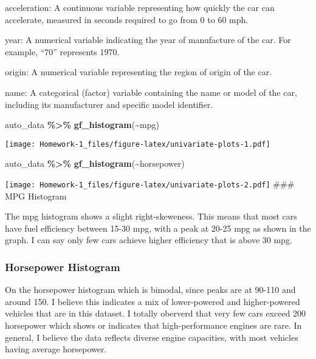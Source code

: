 \documentclass[
]{article}
\newenvironment{Shaded}{\begin{snugshade}}{\end{snugshade}}
\newcommand{\FunctionTok}[1]{\textcolor[rgb]{0.13,0.29,0.53}{\textbf{#1}}}
\newcommand{\NormalTok}[1]{#1}
\newcommand{\SpecialCharTok}[1]{\textcolor[rgb]{0.81,0.36,0.00}{\textbf{#1}}}
\begin{document}
acceleration: A continuous variable representing how quickly the car can
accelerate, measured in seconds required to go from 0 to 60 mph.

year: A numerical variable indicating the year of manufacture of the
car. For example, ``70'' represents 1970.

origin: A numerical variable representing the region of origin of the
car.

name: A categorical (factor) variable containing the name or model of
the car, including its manufacturer and specific model identifier.

\begin{Shaded}
\begin{Highlighting}[]
\NormalTok{auto\_data }\SpecialCharTok{\%\textgreater{}\%} 
  \FunctionTok{gf\_histogram}\NormalTok{(}\SpecialCharTok{\textasciitilde{}}\NormalTok{mpg)}
\end{Highlighting}
\end{Shaded}

\texttt{[image: Homework-1\_files/figure-latex/univariate-plots-1.pdf]}

\begin{Shaded}
\begin{Highlighting}[]
\NormalTok{auto\_data }\SpecialCharTok{\%\textgreater{}\%} 
  \FunctionTok{gf\_histogram}\NormalTok{(}\SpecialCharTok{\textasciitilde{}}\NormalTok{horsepower)}
\end{Highlighting}
\end{Shaded}

\texttt{[image: Homework-1\_files/figure-latex/univariate-plots-2.pdf]}
\#\#\# MPG Histogram

The mpg histogram shows a slight right-skeweness. This means that most
cars have fuel efficiency between 15-30 mpg, with a peak at 20-25 mpg as
shown in the graph. I can say only few cars achieve higher efficiency
that is above 30 mpg.

\subsubsection{Horsepower Histogram}\label{horsepower-histogram}

On the horsepower histogram which is bimodal, since peaks are at 90-110
and around 150. I believe this indicates a mix of lower-powered and
higher-powered vehicles that are in this dataset. I totally oberverd
that very few cars exceed 200 horsepower which shows or indicates that
high-performance engines are rare. In general, I believe the data
reflects diverse engine capacities, with most vehicles having average
horsepower.
\end{document}
